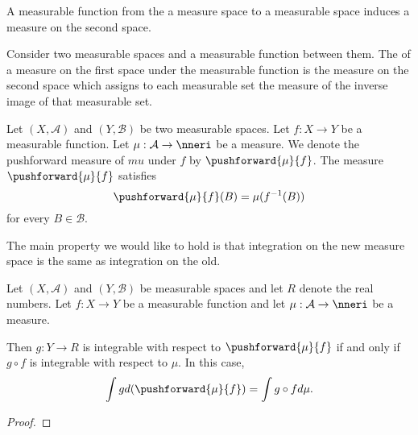 
\sbasic



\sstart



A measurable
function from the
a measure space
to a measurable space
induces a measure
on the second space.


Consider two measurable
spaces and a measurable
function between them.
The
of a measure on the first space
under the measurable function
is the measure on the second space
which assigns to each measurable set
the measure of the inverse image of
that measurable set.


Let
$(X, \mathcal{A})$
and
$(Y, \mathcal{B})$
be two measurable spaces.
Let $f: X \to Y$ be
a measurable function.
Let
$\mu: \mathcal{A} \to \nneri$
be a measure.
We denote the
pushforward measure of $mu$
under $f$ by
$\pushforward{\mu}{f}$.
The measure
$\pushforward{\mu}{f}$
satisfies
\[
  \pushforward{\mu}{f}(B) = \mu(f^{-1}(B))
\]
for every $B \in \mathcal{B}$.


The main property
we would like to hold
is that integration
on the new measure space
is the same as integration
on the old.

\begin{prop}
  Let
  $(X, \mathcal{A})$
  and
  $(Y, \mathcal{B})$
  be measurable spaces
  and let $R$ denote
  the real numbers.
  Let $f: X \to Y$ be
  a measurable function
  and let
  $\mu: \mathcal{A} \to \nneri$
  be a measure.

  Then $g: Y \to R$
  is integrable with
  respect to
  $\pushforward{\mu}{f}$
  if and only if
  $g \circ f$
  is integrable with
  respect to
  $\mu$.
  In this case,
  \[
    \int g d(\pushforward{\mu}{f})
    =
    \int g \circ f d\mu.
  \]
  \begin{proof}
  \end{proof}
\end{prop}

\strats
